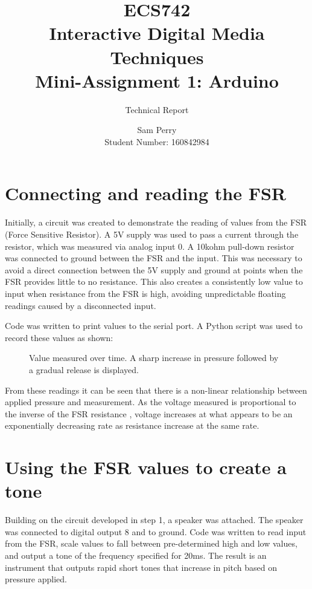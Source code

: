 \documentclass[titlepage]{scrartcl}
\begin{document}
    \title{ECS742\\Interactive Digital Media Techniques\\Mini-Assignment 1: Arduino}
    \subtitle{\LARGE{Technical Report}}
    \author{Sam Perry\\Student Number: 160842984}
    \date{}
    \maketitle

    \section{Connecting and reading the FSR}
    Initially, a circuit was created to demonstrate the reading of values from
    the FSR (Force Sensitive Resistor).  A 5V supply was used to pass a current
    through the resistor, which was measured via analog input 0.  A 10kohm
    pull-down resistor was connected to ground between the FSR and the input.
    This was necessary to avoid a direct connection between the 5V supply and
    ground at points when the FSR provides little to no resistance. This also
    creates a consistently low value to input when resistance from the FSR
    is high, avoiding unpredictable floating readings caused by a disconnected
    input.\\
    \begin{figure}[H]
    \end{figure}

    Code was written to print values to the serial port. A Python script was
    used to record these values as shown:
    \begin{figure}[H]
        \caption{Value measured over time. A sharp increase in pressure followed by a gradual release is displayed.}
    \end{figure}

    From these readings it can be seen that there is a non-linear relationship
    between applied pressure and measurement. As the voltage measured is
    proportional to the inverse of the FSR resistance \parencite{ada2016},
    voltage increases at what appears to be an exponentially decreasing rate as
    resistance increase at the same rate.

    \section{Using the FSR values to create a tone}
    Building on the circuit developed in step 1, a speaker was attached. The
    speaker was connected to digital output 8 and to ground. Code was written
    to read input from the FSR, scale values to fall between pre-determined
    high and low values, and output a tone of the frequency specified for 20ms. 
    The result is an instrument that outputs rapid short tones that increase in
    pitch based on pressure applied.
\end{document}
